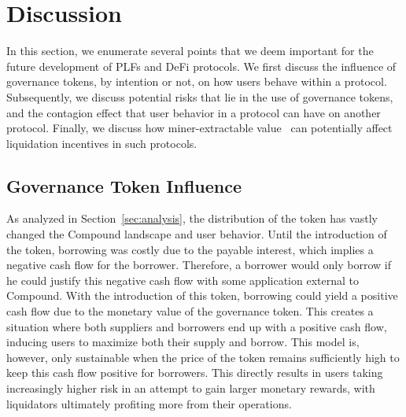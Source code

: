 \section{Discussion}
\label{sec:discussion}
In this section, we enumerate several points that we deem important for the future development of PLFs and DeFi protocols.
We first discuss the influence of governance tokens, by intention or not, on how users behave within a protocol.
Subsequently, we discuss potential risks that lie in the use of governance tokens, and the contagion effect that user behavior in a protocol can have on another protocol.
Finally, we discuss how miner-extractable value~\cite{daian2020flash} can potentially affect liquidation incentives in such protocols.

\subsection{Governance Token Influence}
As analyzed in Section~\ref{sec:analysis}, the distribution of the  token has vastly changed the Compound landscape and user behavior.
Until the introduction of the token, borrowing was costly due to the payable interest, which implies a negative cash flow for the borrower. Therefore, a borrower would only borrow if he could justify this negative cash flow with some application external to Compound.
With the introduction of this token, borrowing could yield a positive cash flow due to the monetary value of the governance token.
This creates a situation where both suppliers and borrowers end up with a positive cash flow, inducing users to maximize both their supply and borrow.
This model is, however, only sustainable when the price of the  token remains sufficiently high to keep this cash flow positive for borrowers.
This directly results in users taking increasingly higher risk in an attempt to gain larger monetary rewards, with liquidators ultimately profiting more from their operations.

